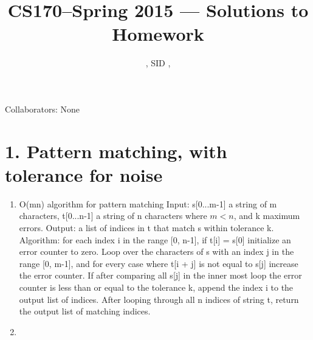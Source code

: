 \documentclass[11pt]{article}
\title{CS170--Spring 2015 --- Solutions to Homework \Homework}
\author{\Name, SID \SID, \texttt{\Login}}
\date{}
\newenvironment{qparts}{\begin{enumerate}[{(}a{)}]}{\end{enumerate}}
\begin{document}
\maketitle

Collaborators: None

\section*{1. Pattern matching, with tolerance for noise}
\begin{qparts}
\item O(mn) algorithm for pattern matching\newline
Input: s[0...m-1] a string of m characters, t[0...n-1] a string of n characters where $m < n$, and k maximum errors.\newline
Output: a list of indices in t that match s within tolerance k. \newline
Algorithm: for each index i in the range [0, n-1], if t[i] = s[0] initialize an error counter to zero. Loop over the characters of s with an index j in the range [0, m-1], and for every case where t[i + j] is not equal to s[j] increase the error counter. If after comparing all s[j] in the inner most loop the error counter is less than or equal to the tolerance k, append the index i to the output list of indices. After looping through all n indices of string t, return the output list of matching indices.
\item

\end{qparts}



\newpage
\end{document}
